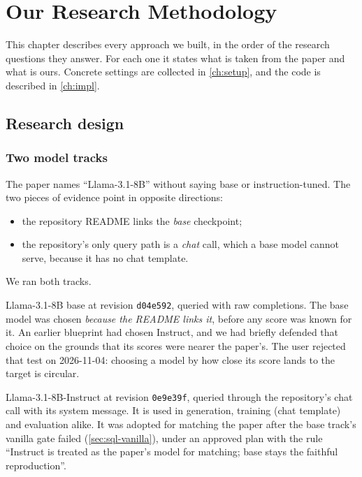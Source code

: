 \chapter{Our Research Methodology}\label{ch:method}

This chapter describes every approach we built, in the order of the research questions they answer. For each one it
states what is taken from the paper and what is ours. Concrete settings are collected in \cref{ch:setup}, and the code
is described in \cref{ch:impl}.

\section{Research design}\label{sec:design}

\subsection{Two model tracks}

The paper names ``Llama-3.1-8B'' without saying base or instruction-tuned. The two pieces of evidence point in
opposite directions:
\begin{itemize}
\item the repository README links the \emph{base} checkpoint;
\item the repository's only query path is a \emph{chat} call, which a base model cannot serve, because it has no chat
template.
\end{itemize}
We ran both tracks.

\begin{description}[style=nextline,leftmargin=1.2em]
\item[Base track (2026-11-04 onward): faithful to the README.] Llama-3.1-8B base at revision \texttt{d04e592}, queried
with raw completions. The base model was chosen \emph{because the README links it}, before any score was known for it.
An earlier blueprint had chosen Instruct, and we had briefly defended that choice on the grounds that its scores were
nearer the paper's. The user rejected that test on 2026-11-04: choosing a model by how close its score lands to the
target is circular.
\item[Instruct track (2026-11-10 onward): faithful to the repository's query path.] Llama-3.1-8B-Instruct at revision
\texttt{0e9e39f}, queried through the repository's chat call with its system message. It is used in generation,
training (chat template) and evaluation alike. It was adopted for matching the paper after the base track's vanilla
gate failed (\cref{sec:sql-vanilla}), under an approved plan with the rule ``Instruct is treated as the paper's model
for matching; base stays the faithful reproduction''.
\end{description}

